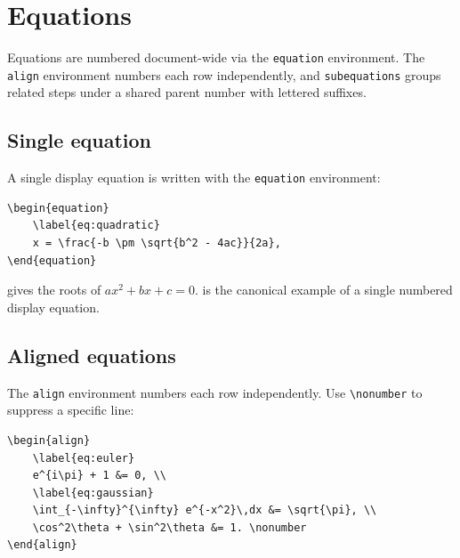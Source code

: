 \lipsum[1]

\section{Equations} \label{sec:equations}

Equations are numbered document-wide via the \texttt{equation}
environment. The \texttt{align} environment numbers each row
independently, and \texttt{subequations} groups related steps
under a shared parent number with lettered suffixes.

\lipsum[1]

\subsection{Single equation}

A single display equation is written with the \texttt{equation} environment:

\begin{verbatim}
\begin{equation}
    \label{eq:quadratic}
    x = \frac{-b \pm \sqrt{b^2 - 4ac}}{2a},
\end{equation}
\end{verbatim}



gives the roots of $ax^2 + bx + c = 0$.  is
the canonical example of a single numbered display equation.

\lipsum[1]

\subsection{Aligned equations}

The \texttt{align} environment numbers each row independently.
Use \verb|\nonumber| to suppress a specific line:

\begin{verbatim}
\begin{align}
    \label{eq:euler}
    e^{i\pi} + 1 &= 0, \\
    \label{eq:gaussian}
    \int_{-\infty}^{\infty} e^{-x^2}\,dx &= \sqrt{\pi}, \\
    \cos^2\theta + \sin^2\theta &= 1. \nonumber
\end{align}
\end{verbatim}

